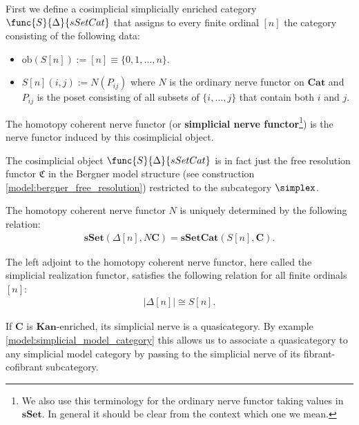     First we define a cosimplicial simplicially enriched category $\func{S}{\Delta}{sSetCat}$ that assigns to every finite ordinal $[n]$ the category consisting of the following data:
    \begin{itemize}
        \item $\text{ob}(S[n]) := [n]\equiv\{0,1,\ldots,n\}$.
        \item $S[n](i, j) := N(P_{ij})$ where $N$ is the ordinary nerve functor on $\mathbf{Cat}$ and $P_{ij}$ is the poset consisting of all subsets of $\{i,\ldots,j\}$ that contain both $i$ and $j$.
    \end{itemize}
    The homotopy coherent nerve functor (or \textbf{simplicial nerve functor}\footnote{We also use this terminology for the ordinary nerve functor taking values in $\mathbf{sSet}$. In general it should be clear from the context which one we mean.}) is the nerve functor induced by this cosimplicial object.
    \begin{remark}
        The cosimplicial object $\func{S}{\Delta}{sSetCat}$ is in fact just the free resolution functor $\mathfrak{C}$ in the Bergner model structure (see construction \ref{model:bergner_free_resolution}) restricted to the subcategory $\simplex$.
    \end{remark}

    \begin{property}
        The homotopy coherent nerve functor $N$ is uniquely determined by the following relation:
        \begin{gather}
            \mathbf{sSet}(\Delta[n], N\mathbf{C})=\mathbf{sSetCat}(S[n], \mathbf{C}).
        \end{gather}
    \end{property}

    \begin{property}
        The left adjoint to the homotopy coherent nerve functor, here called the simplicial realization functor, satisfies the following relation for all finite ordinals $[n]$:
        \begin{gather}
            |\Delta[n]| \cong S[n].
        \end{gather}
    \end{property}

    \begin{property}[Quasicategories]
        If $\mathbf{C}$ is $\mathbf{Kan}$-enriched, its simplicial nerve is a quasicategory. By example \ref{model:simplicial_model_category} this allows us to associate a quasicategory to any simplicial model category by passing to the simplicial nerve of its fibrant-cofibrant subcategory.
    \end{property}

